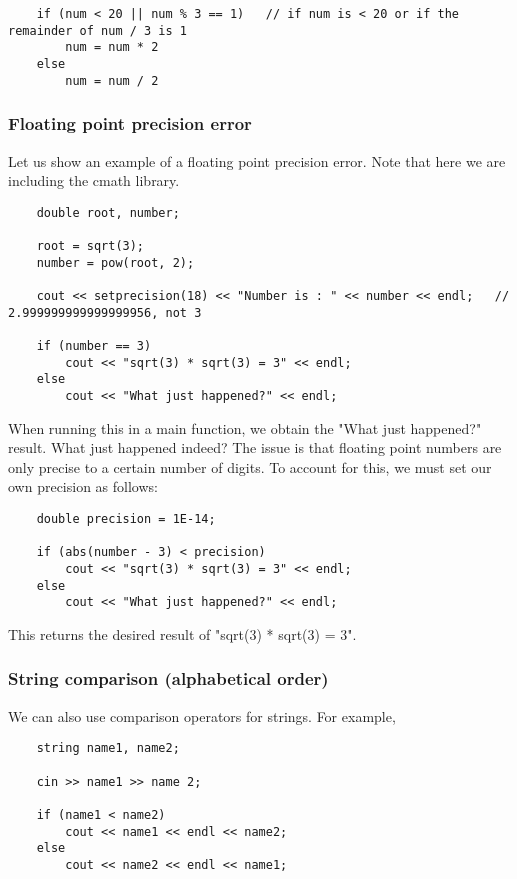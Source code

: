 \documentclass[]{article}
\begin{document}
\begin{lstlisting}
	if (num < 20 || num % 3 == 1)	// if num is < 20 or if the remainder of num / 3 is 1
		num = num * 2
	else
		num = num / 2
\end{lstlisting}

\subsubsection{Floating point precision error}

Let us show an example of a floating point precision error. Note that here we are including the cmath library.

\begin{lstlisting}
	double root, number;
	
	root = sqrt(3);
	number = pow(root, 2);
	
	cout << setprecision(18) << "Number is : " << number << endl;	// 2.999999999999999956, not 3
	
	if (number == 3)
		cout << "sqrt(3) * sqrt(3) = 3" << endl;
	else
		cout << "What just happened?" << endl;
\end{lstlisting}
\bigbreak


When running this in a main function, we obtain the "What just happened?" result. What just happened indeed? The issue is that floating point numbers are only precise to a certain number of digits. To account for this, we must set our own precision as follows:

\begin{lstlisting}
	double precision = 1E-14;
	
	if (abs(number - 3) < precision)
		cout << "sqrt(3) * sqrt(3) = 3" << endl;
	else
		cout << "What just happened?" << endl;
\end{lstlisting}
\bigbreak
 
 This returns the desired result of "sqrt(3) * sqrt(3) = 3".\\
 

\subsubsection{String comparison (alphabetical order)}

We can also use comparison operators for strings. For example,

\begin{lstlisting}
	string name1, name2;
	
	cin >> name1 >> name 2;
	
	if (name1 < name2)
		cout << name1 << endl << name2;
	else
		cout << name2 << endl << name1;
\end{lstlisting}
\bigbreak
\end{document}
